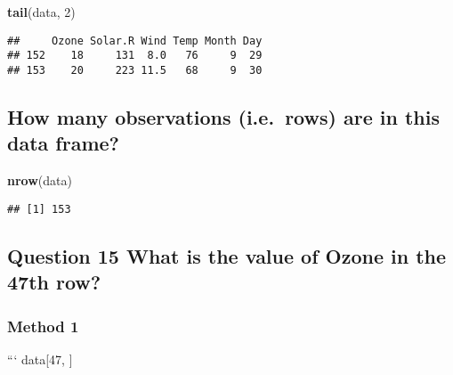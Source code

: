 \documentclass[]{article}
\newenvironment{Shaded}{\begin{snugshade}}{\end{snugshade}}
\newcommand{\DecValTok}[1]{\textcolor[rgb]{0.00,0.00,0.81}{#1}}
\newcommand{\KeywordTok}[1]{\textcolor[rgb]{0.13,0.29,0.53}{\textbf{#1}}}
\newcommand{\NormalTok}[1]{#1}
\newcommand{\OperatorTok}[1]{\textcolor[rgb]{0.81,0.36,0.00}{\textbf{#1}}}
\begin{document}
\begin{Shaded}
\begin{Highlighting}[]
\KeywordTok{tail}\NormalTok{(data, }\DecValTok{2}\NormalTok{)}
\end{Highlighting}
\end{Shaded}

\begin{verbatim}
##     Ozone Solar.R Wind Temp Month Day
## 152    18     131  8.0   76     9  29
## 153    20     223 11.5   68     9  30
\end{verbatim}

\hypertarget{how-many-observations-i.e.rows-are-in-this-data-frame}{%
\subsection{How many observations (i.e.~rows) are in this data
frame?}\label{how-many-observations-i.e.rows-are-in-this-data-frame}}

\begin{Shaded}
\begin{Highlighting}[]
\KeywordTok{nrow}\NormalTok{(data)}
\end{Highlighting}
\end{Shaded}

\begin{verbatim}
## [1] 153
\end{verbatim}

\hypertarget{question-15-what-is-the-value-of-ozone-in-the-47th-row}{%
\subsection{Question 15 What is the value of Ozone in the 47th
row?}\label{question-15-what-is-the-value-of-ozone-in-the-47th-row}}

\hypertarget{method-1-1}{%
\subsubsection{Method 1}\label{method-1-1}}

``` data{[}47, {]}

\hypertarget{section}{%
\subsubsection{}\label{section}}

\begin{Shaded}
\end{Shaded}
\end{document}

